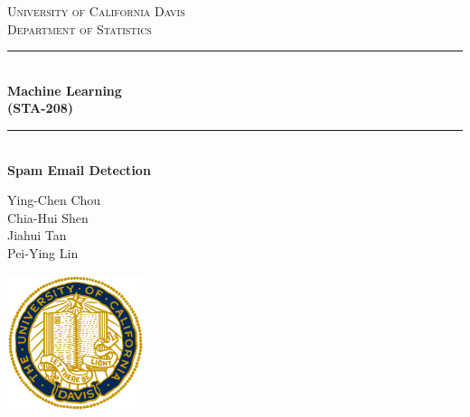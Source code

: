 \documentclass[12pt]{article}
\begin{document}
\begin{titlepage}

\newcommand{\HRule}{\rule{\linewidth}{0.5mm}} %

\center %
 

\textsc{\LARGE University of California Davis }\\[0.3cm] 
\textsc{\Large Department of Statistics}\\[0.5cm] 


\HRule \\[0.4cm]
{ \huge \bfseries Machine Learning\\  (STA-208)}\\[0.03cm]
\HRule \\[1.5cm]

\hfill \break \hfill \break \hfill \break
{ \huge \bfseries Spam Email Detection}\\
\hfill \break \hfill \break \hfill \break
\hfill \break

{\large Ying-Chen Chou  \\ 
        Chia-Hui Shen   \\
        Jiahui Tan      \\
        Pei-Ying Lin}  \\

\hfill \break

\includegraphics[width=4cm]{./plots/logo.png}\\[1cm] 


 

\vfill %

\end{titlepage}
\end{document}
